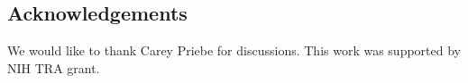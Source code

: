 \documentclass[aps,preprint,nofootinbib,floatfix]{revtex4-1}
\begin{document}
\subsection*{Acknowledgements}
We would like to thank Carey Priebe for discussions.
This work was supported by NIH TRA  grant.




\end{document}
